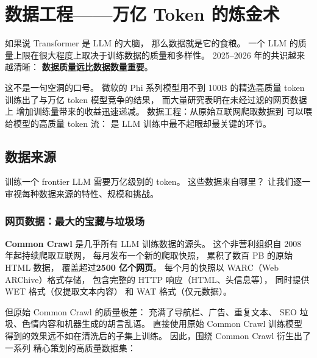 \chapter{数据工程——万亿 Token 的炼金术}
\label{ch:data}

如果说 Transformer 是 LLM 的大脑，
那么数据就是它的食粮。
一个 LLM 的质量上限在很大程度上取决于训练数据的质量和多样性。
2025--2026 年的共识越来越清晰：
\textbf{数据质量远比数据数量重要}。

这不是一句空洞的口号。
微软的 Phi 系列模型用不到 100B 的精选高质量 token
训练出了与万亿 token 模型竞争的结果，
而大量研究表明在未经过滤的网页数据上
增加训练量带来的收益迅速递减。
数据工程：从原始互联网爬取数据到
可以喂给模型的高质量 token 流：
是 LLM 训练中最不起眼却最关键的环节。

\section{数据来源}

训练一个 frontier LLM 需要万亿级别的 token。
这些数据来自哪里？
让我们逐一审视每种数据来源的特性、规模和挑战。

\subsection{网页数据：最大的宝藏与垃圾场}

\textbf{Common Crawl} 是几乎所有 LLM 训练数据的源头。
这个非营利组织自 2008 年起持续爬取互联网，
每月发布一个新的爬取快照，
累积了数百 PB 的原始 HTML 数据，
覆盖超过\textbf{2500 亿个网页}。
每个月的快照以 WARC（Web ARChive）格式存储，
包含完整的 HTTP 响应（HTML、头信息等），
同时提供 WET 格式（仅提取文本内容）
和 WAT 格式（仅元数据）。

但原始 Common Crawl 的质量极差：
充满了导航栏、广告、重复文本、
SEO 垃圾、色情内容和机器生成的胡言乱语。
直接使用原始 Common Crawl 训练模型
得到的效果远不如在清洗后的子集上训练。
因此，围绕 Common Crawl 衍生出了一系列
精心策划的高质量数据集：

